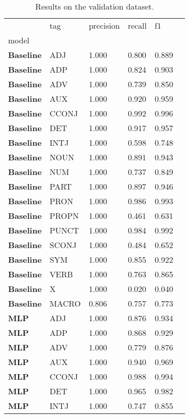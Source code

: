 \begin{table}
\caption{Results on the validation dataset.}
\label{tab::ex_10_valid}
\begin{tabular}{|l|l|l|l|l|l|}
\toprule
 & tag & precision & recall & f1 \\
model &  &  &  &  \\
\midrule
\textbf{Baseline} & ADJ & 1.000 & 0.800 & 0.889 \\
\textbf{Baseline} & ADP & 1.000 & 0.824 & 0.903 \\
\textbf{Baseline} & ADV & 1.000 & 0.739 & 0.850 \\
\textbf{Baseline} & AUX & 1.000 & 0.920 & 0.959 \\
\textbf{Baseline} & CCONJ & 1.000 & 0.992 & 0.996 \\
\textbf{Baseline} & DET & 1.000 & 0.917 & 0.957 \\
\textbf{Baseline} & INTJ & 1.000 & 0.598 & 0.748 \\
\textbf{Baseline} & NOUN & 1.000 & 0.891 & 0.943 \\
\textbf{Baseline} & NUM & 1.000 & 0.737 & 0.849 \\
\textbf{Baseline} & PART & 1.000 & 0.897 & 0.946 \\
\textbf{Baseline} & PRON & 1.000 & 0.986 & 0.993 \\
\textbf{Baseline} & PROPN & 1.000 & 0.461 & 0.631 \\
\textbf{Baseline} & PUNCT & 1.000 & 0.984 & 0.992 \\
\textbf{Baseline} & SCONJ & 1.000 & 0.484 & 0.652 \\
\textbf{Baseline} & SYM & 1.000 & 0.855 & 0.922 \\
\textbf{Baseline} & VERB & 1.000 & 0.763 & 0.865 \\
\textbf{Baseline} & X & 1.000 & 0.020 & 0.040 \\
\textbf{Baseline} & MACRO & 0.806 & 0.757 & 0.773 \\
\textbf{MLP} & ADJ & 1.000 & 0.876 & 0.934 \\
\textbf{MLP} & ADP & 1.000 & 0.868 & 0.929 \\
\textbf{MLP} & ADV & 1.000 & 0.779 & 0.876 \\
\textbf{MLP} & AUX & 1.000 & 0.940 & 0.969 \\
\textbf{MLP} & CCONJ & 1.000 & 0.988 & 0.994 \\
\textbf{MLP} & DET & 1.000 & 0.965 & 0.982 \\
\textbf{MLP} & INTJ & 1.000 & 0.747 & 0.855 \\

\end{tabular}
\end{table}
